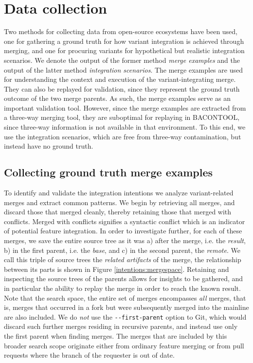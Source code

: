 \section{Data collection}
Two methods for collecting data from open-source ecosystems have been used, one for gathering a ground truth for how variant integration is achieved through merging, and one for procuring variants for hypothetical but realistic  integration scenarios. We denote the output of the former method \textit{merge examples} and the output of the latter method \textit{integration scenarios}. The merge examples are used for understanding the context and execution of the variant-integrating merge. They can also be replayed for validation, since they represent the ground truth outcome of the two merge parents. As such, the merge examples serve as an important validation tool. However, since the merge examples are extracted from a three-way merging tool, they are suboptimal for replaying in BACONTOOL, since three-way information is  not available in that environment. To this end, we use the integration scenarios, which are free from three-way contamination, but instead have no ground truth.

\subsection{Collecting ground truth merge examples}
To identify and validate the integration intentions we analyze variant-related merges and extract common patterns. We begin by retrieving all merges, and discard those that merged cleanly, thereby retaining those that merged with conflicts. Merged with conflicts signifies a syntactic conflict which is an indicator of potential feature integration. In order to investigate further, for each of these merges, we save the entire source tree as it was a) after the merge, i.e. the \textit{result}, b) in the first parent, i.e. the \textit{base}, and c) in the second parent, the \textit{remote}. We call this triple of source trees the \textit{related artifacts} of the merge, the relationship between its parts is shown in Figure \ref{intentions:mergespace}. Retaining and inspecting the source trees of the parents allows for insights to be gathered, and in particular the ability to replay the merge in order to reach the known result. Note that the search space, the entire set of merges encompasses \textit{all} merges, that is, merges that occurred in a fork but were subsequently merged into the mainline are also included. We do \textit{not} use the \texttt{-{}-first-parent} option to Git, which would discard such further merges residing in recursive parents, and instead use only the first parent when finding merges. The merges that are included by this broader search scope originate either from ordinary feature merging or from pull requests where the branch of the requester is out of date.%

